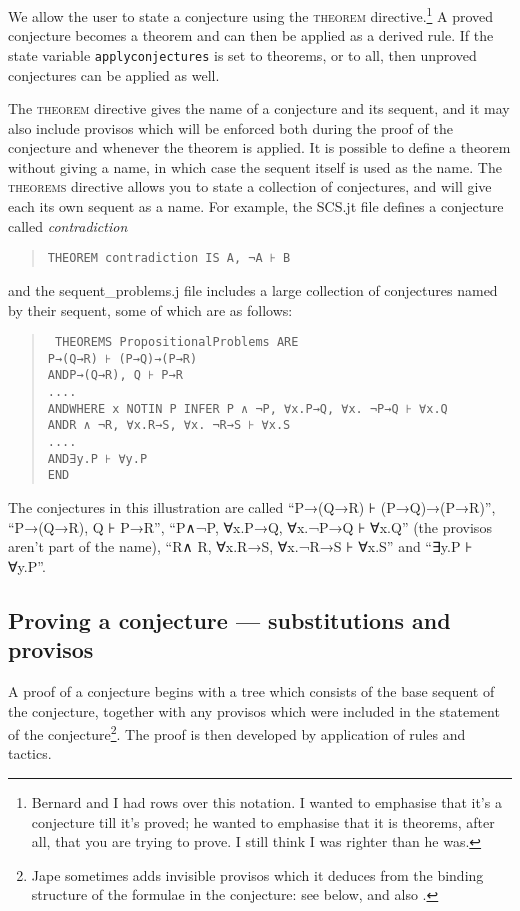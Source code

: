 We allow the user to state a conjecture using the \textsc{theorem} directive.\footnote{Bernard and I had rows over this notation. I wanted to emphasise that it's a conjecture till it's proved; he wanted to emphasise that it is theorems, after all, that you are trying to prove. I still think I was righter than he was.} A proved conjecture becomes a theorem and can then be applied as a derived rule. If the state variable \texttt{applyconjectures} is set to theorems, or to all, then unproved conjectures can be applied as well.

The \textsc{theorem} directive gives the name of a conjecture and its sequent, and it may also include provisos which will be enforced both during the proof of the conjecture and whenever the theorem is applied. It is possible to define a theorem without giving a name, in which case the sequent itself is used as the name. The \textsc{theorems} directive allows you to state a collection of conjectures, and will give each its own sequent as a name. For example, the SCS.jt file defines a conjecture called \textit{contradiction}
\begin{quote}
\tt THEOREM contradiction IS A, ¬A ⊦ B
\end{quote}
and the sequent\_problems.j file includes a large collection of conjectures named by their sequent, some of which are as follows:
\begin{quote}\tt
THEOREMS PropositionalProblems ARE\\
\tab P→(Q→R) ⊦ (P→Q)→(P→R)\\
AND\tab P→(Q→R), Q ⊦ P→R\\
\tab ....\\
AND\tab WHERE x NOTIN P INFER P ∧ ¬P, ∀x.P→Q, ∀x. ¬P→Q ⊦ ∀x.Q \\
AND\tab R ∧ ¬R, ∀x.R→S, ∀x. ¬R→S ⊦ ∀x.S\\
....\\
AND\tab ∃y.P ⊦ ∀y.P\\
END
\end{quote}
The conjectures in this illustration are called ``P→(Q→R) ⊦ (P→Q)→(P→R)'', ``P→(Q→R), Q ⊦ P→R'', ``P∧¬P, ∀x.P→Q, ∀x.¬P→Q ⊦ ∀x.Q'' (the provisos aren't part of the name), ``R∧ R, ∀x.R→S, ∀x.¬R→S ⊦ ∀x.S'' and ``∃y.P ⊦ ∀y.P''.

\subsection{Proving a conjecture --- substitutions and provisos}

A proof of a conjecture begins with a tree which consists of the base sequent of the conjecture, together with any provisos which were included in the statement of the conjecture\footnote{Jape sometimes adds invisible provisos which it deduces from the binding structure of the formulae in the conjecture: see below, and also .}. The proof is then developed by application of rules and tactics.

